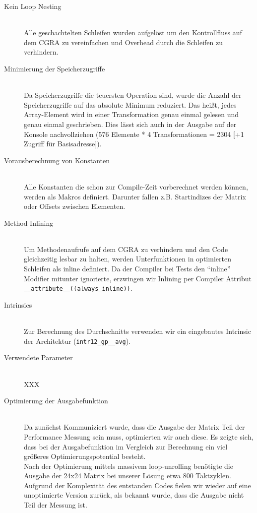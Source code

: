 \documentclass[oneside,11pt,accentcolor=tud2b, nochapname]{tudexercise}
\begin{document}
\begin{description}	
	\item[Kein Loop Nesting] \hfill \\
	Alle geschachtelten Schleifen wurden aufgelöst um den Kontrollfluss auf dem CGRA zu vereinfachen und Overhead durch die Schleifen zu verhindern.\\
	
	\item[Minimierung der Speicherzugriffe] \hfill \\
	Da Speicherzugriffe die teuersten Operation sind, wurde die Anzahl der Speicherzugriffe auf das absolute Minimum reduziert.
	Das heißt, jedes Array-Element wird in einer Transformation genau einmal gelesen und genau einmal geschrieben.
	Dies lässt sich auch in der Ausgabe auf der Konsole nachvollziehen (576 Elemente * 4 Transformationen = 2304 [+1 Zugriff für Basisadresse]).\\
	
	\item[Vorausberechnung von Konstanten] \hfill \\
	Alle Konstanten die schon zur Compile-Zeit vorberechnet werden können, werden als Makros definiert. 
	Darunter fallen z.B. Startindizes der Matrix oder Offsets zwischen Elementen.\\
	
	\item[Method Inlining] \hfill \\
	Um Methodenaufrufe auf dem CGRA zu verhindern und den Code gleichzeitig lesbar zu halten, werden Unterfunktionen in optimierten Schleifen als inline definiert.
	Da der Compiler bei Tests den "`inline"' Modifier mitunter ignorierte, erzwingen wir  Inlining per Compiler Attribut \texttt{\_\_attribute\_\_((always\_inline))}.\\
	
	\item[Intrinsics] \hfill \\
	Zur Berechnung des Durchschnitts verwenden wir ein eingebautes Intrinsic der Architektur (\texttt{intr12\_gp\_\_avg}).\\
	
	\item[Verwendete Parameter] \hfill \\
	XXX\\
	
	\item[Optimierung der Ausgabefunktion] \hfill \\
	Da zunächst Kommuniziert wurde, dass die Ausgabe der Matrix Teil der Performance Messung sein muss, optimierten wir auch diese.
	Es zeigte sich, dass bei der Ausgabefunktion im Vergleich zur Berechnung ein viel größeres Optimierungspotential besteht.\\
	Nach der Optimierung mittels massivem loop-unrolling benötigte die Ausgabe der 24x24 Matrix bei unserer Lösung etwa 800 Taktzyklen.
	Aufgrund der Komplexität des entstanden Codes fielen wir wieder auf eine unoptimierte Version zurück, als bekannt wurde, dass die Ausgabe nicht Teil der Messung ist.
	
\end{description}
\end{document}
